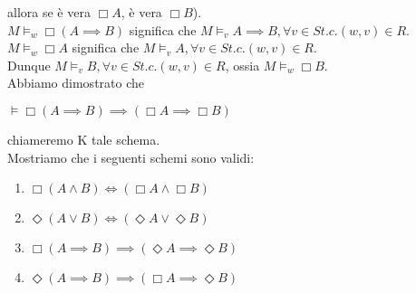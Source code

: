 \documentclass[a4paper,12pt]{article}
\theoremstyle{def}
\theoremstyle{prop}
\theoremstyle{esempio}
\theoremstyle{dimostrazione}
\theoremstyle{teo}
\theoremstyle{osservazione}
\begin{document}
allora se è vera \(\Box A\), è vera \(\Box B\)).\\
\(M \vDash_w \Box (A \implies B)\) significa che \(M \vDash_v A \implies B, \forall v \in S t.c. (w,v) \in R\).\\
\(M \vDash_w \Box A\) significa che \(M \vDash_v A, \forall v \in S t.c. (w,v) \in R\).\\
Dunque \(M \vDash_v B, \forall v \in S t.c. (w,v) \in R\), ossia \(M \vDash_w \Box B\).\\
Abbiamo dimostrato che
\begin{center}
	\(\vDash \Box (A \implies B) \implies (\Box A \implies \Box B)\)
\end{center}
chiameremo K tale schema.\\
Mostriamo che i seguenti schemi sono validi:
\begin{enumerate}
	\item \(\Box (A \land B) \iff (\Box A \land \Box B)\)
	\item \(\Diamond (A \lor B) \iff (\Diamond A \lor \Diamond B)\)
	\item \(\Box (A \implies B) \implies (\Diamond A \implies \Diamond B)\)
	\item \(\Diamond (A \implies B) \implies (\Box A \implies \Diamond B)\)
\end{enumerate}
\newpage
\end{document}
